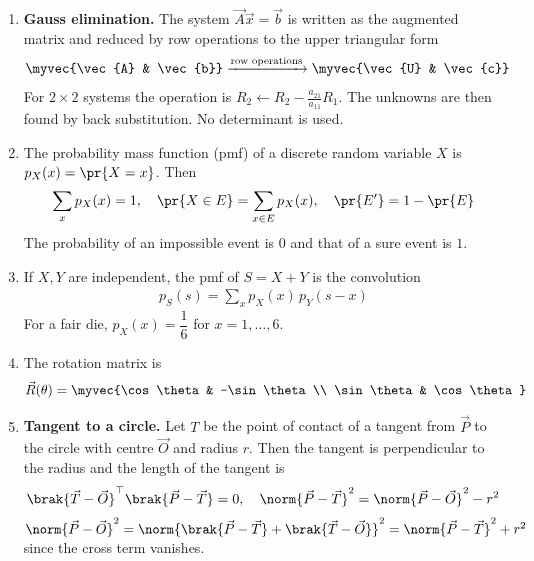 \begin{enumerate}[label=\thesubsection.\arabic*, ref=\thesubsection.\theenumi,itemsep=0pt]
\item \textbf{Gauss elimination.} The system $\vec{A}\vec{x} = \vec{b}$ is written as the augmented matrix and reduced by row operations to the upper triangular form
\begin{align}
\myvec{\vec{A} & \vec{b}} \xrightarrow{\text{row operations}} \myvec{\vec{U} & \vec{c}}
\label{eq:cb10-gauss}
\end{align}
For $2 \times 2$ systems the operation is $R_2 \leftarrow R_2 - \frac{a_{21}}{a_{11}}R_1$. The unknowns are then found by back substitution. No determinant is used.

\item The probability mass function (pmf) of a discrete random variable $X$ is $p_X(x) = \pr{X = x}$. Then
\begin{align}
\sum_{x} p_X(x) = 1, \quad \pr{X \in E} = \sum_{x \in E} p_X(x), \quad \pr{E'} = 1 - \pr{E}
\label{eq:cb10-pmf}
\end{align}
The probability of an impossible event is $0$ and that of a sure event is $1$.

\item If $X, Y$ are independent, the pmf of $S = X + Y$ is the convolution
\begin{align}
p_S(s) = \sum_{x} p_X(x)\, p_Y(s - x)
\label{eq:cb10-conv}
\end{align}
For a fair die, $p_X(x) = \dfrac{1}{6}$ for $x = 1, \dots, 6$.

\item The rotation matrix is
\begin{align}
\vec{R}(\theta) = \myvec{\cos\theta & -\sin\theta \\ \sin\theta & \cos\theta}
\label{eq:cb10-rot}
\end{align}

\item \textbf{Tangent to a circle.} Let $T$ be the point of contact of a tangent from $\vec{P}$ to the circle with centre $\vec{O}$ and radius $r$. Then the tangent is perpendicular to the radius and the length of the tangent is
\begin{align}
\brak{\vec{T}-\vec{O}}^{\top}\brak{\vec{P}-\vec{T}} = 0, \quad \norm{\vec{P}-\vec{T}}^2 = \norm{\vec{P}-\vec{O}}^2 - r^2
\label{eq:cb10-tangent}
\end{align}
\solution $\norm{\vec{P}-\vec{O}}^2 = \norm{\brak{\vec{P}-\vec{T}} + \brak{\vec{T}-\vec{O}}}^2 = \norm{\vec{P}-\vec{T}}^2 + r^2$ since the cross term vanishes.


\end{enumerate}
